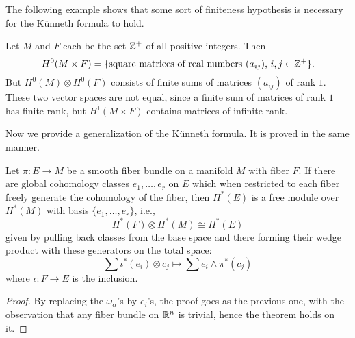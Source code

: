 The following example shows that some sort of finiteness hypothesis is necessary for the K\"unneth formula to hold.
\begin{example}
Let $M$ and $F$ each be the set $\mathbb{Z}^+$ of all positive integers. Then
\[H^0(M\times F)=\{\text{square matrices of real numbers $(a_{ij})$, $i,j\in\mathbb{Z}^+$}\}.\]
But $H^0(M)\otimes H^0(F)$ consists of finite sums of matrices $(a_{ij})$ of rank $1$. These two vector spaces are not equal, since a finite sum of matrices of rank $1$ 
has finite rank, but $H^)(M\times F)$ contains matrices of infinite rank.
\end{example}
Now we provide a generalization of the K\"unneth formula. It is proved in the same manner.
\begin{theorem}
Let $\pi:E\to M$ be a smooth fiber bundle on a manifold $M$ with fiber $F$. If there are global cohomology classes $e_1,\dots,e_r$ on $E$ which when restricted to each fiber 
freely generate the cohomology of the fiber, then $H^*(E)$ is a free module over $H^*(M)$ with basis $\{e_1,\dots,e_r\}$, i.e.,
\[H^*(F)\otimes H^*(M) \cong H^*(E)\]
given by pulling back classes from the base space and there forming their wedge product with these generators on the total space:
\[\sum \iota^*(e_i)\otimes c_j\mapsto\sum e_i\wedge \pi^*(c_j)\]
where $\iota:F\to E$ is the inclusion.
\end{theorem}
\begin{proof}
By replacing the $\omega_\alpha$'s by $e_i$'s, the proof goes as the previous one, with the observation that any fiber bundle on $\mathbb{R}^n$ is trivial, hence the theorem holds 
on it.
\end{proof}
